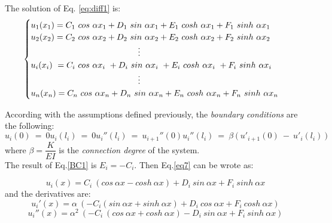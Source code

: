 \documentclass{article}
\begin{document}
{\noindent The solution of Eq. \ref{eq:diff1} is:
\begin{equation}
    \begin{cases}
    u_1(x_1) = C_1 \ cos\ \alpha x_1   +  D_1 \ sin\ \alpha x_1   + E_1 \ cosh\ \alpha x_1   + F_1 \ sinh\ \alpha x_1\\
    u_2(x_2) = C_2 \ cos\ \alpha x_2   +  D_2 \ sin\ \alpha x_2   + E_2 \ cosh\ \alpha x_2   + F_2 \ sinh\ \alpha x_2\\
    \hspace{4.5cm} \vdots\\
    u_i(x_i) \ = C_i \ cos\ \alpha x_i  \  +  D_i \ sin\ \alpha x_i   \  + E_i \ cosh\ \alpha x_i  \  + F_i \ sinh\ \alpha x_i\\
    \hspace{4.5cm} \vdots\\
    u_n(x_n) = C_n \ cos\ \alpha x_n   +  D_n \ sin\ \alpha x_n   + E_n \ cosh\ \alpha x_n   + F_n \ sinh\ \alpha x_n
    \end{cases}
    \label{eq7}
\end{equation}

\noindent According with the assumptions defined previously, the \textit{boundary conditions} are the following:
\begin{subequations}
\begin{equation}
u_i(0) \  = \ 0
\label{BC1}
\end{equation}
\begin{equation}
u_i(l_i) \ = \ 0
\label{BC2}
\end{equation}
\begin{equation}
u_i''(l_i)\ =\  u_{i+1}''(0)
\label{BC3}
\end{equation}
\begin{equation}
u_i''(l_i) \ = \ \beta  \ \big( \ u'_{i+1}(0)\ -\ u'_{i}(l_i) \ \big)
\label{BC4}
\end{equation}
\label{BCS}
\end{subequations}
where $\beta = \dfrac{K}{EI}$ is the \textit{connection degree} of the system.\\

\noindent The result of Eq.\ref{BC1} is $E_i = - C_i$. Then Eq.\ref{eq7} can be wrote as: 

\begin{equation}
    u_i(x) = C_i \ ( cos \ \alpha x - cosh\ \alpha x   ) + D_i \ sin\ \alpha x   + F_i \ sinh\ \alpha x
    \label{equi}
\end{equation}
and the derivatives are:
\begin{equation}
     u_i'(x) = \alpha \ (- C_i (sin\ \alpha x  + sinh\ \alpha x   ) + D_i \ cos\ \alpha x   + F_i \ cosh\ \alpha x  )
    \label{der1}
\end{equation}
\begin{equation}
    u_i''(x) = \alpha^2 \ (- C_i \ ( cos\ \alpha x   + cosh\ \alpha x   ) - D_i \  sin\ \alpha x   + F_i \ sinh\ \alpha x  )
    \label{der1}
\end{equation}

}
\end{document}
